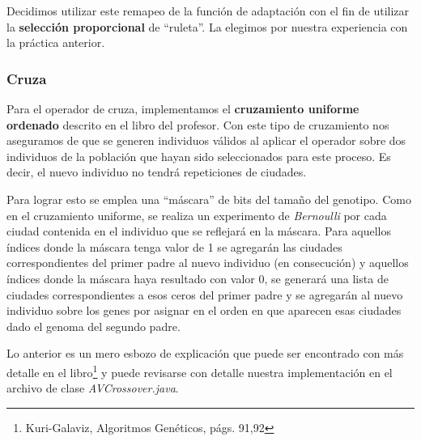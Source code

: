 \documentclass[12pt]{article}
\begin{document}
Decidimos utilizar este remapeo de la función de adaptación con el fin de
utilizar la \textbf{selección proporcional} de ``ruleta''. La elegimos por
nuestra experiencia con la práctica anterior.
\subsubsection*{Cruza}
Para el operador de cruza, implementamos el \textbf{cruzamiento uniforme ordenado}
descrito en el libro del profesor. Con este tipo de cruzamiento nos aseguramos
de que se generen individuos válidos al aplicar el operador sobre dos individuos
de la población que hayan sido seleccionados para este proceso. Es decir,
el nuevo individuo no tendrá repeticiones de ciudades.\par
Para lograr esto se emplea una ``máscara'' de bits del tamaño del genotipo.
Como en el cruzamiento uniforme, se realiza un experimento de \textit{Bernoulli}
por cada ciudad contenida en el individuo que se reflejará en la máscara.
Para aquellos índices donde la máscara tenga valor de 1 se agregarán las ciudades
correspondientes del primer padre al nuevo individuo (en consecución) y
aquellos índices donde la máscara haya resultado con valor 0, se generará una
lista de ciudades correspondientes a esos ceros del primer padre y se agregarán
al nuevo individuo sobre los genes por asignar en el orden en que aparecen esas
ciudades dado el genoma del segundo padre.\par
Lo anterior es un mero esbozo de explicación que puede ser encontrado con más
detalle en el libro\footnote{Kuri-Galaviz, Algoritmos Genéticos, págs. 91,92} y
puede revisarse con detalle nuestra implementación en el archivo de clase
\textit{AVCrossover.java}.
\end{document}
